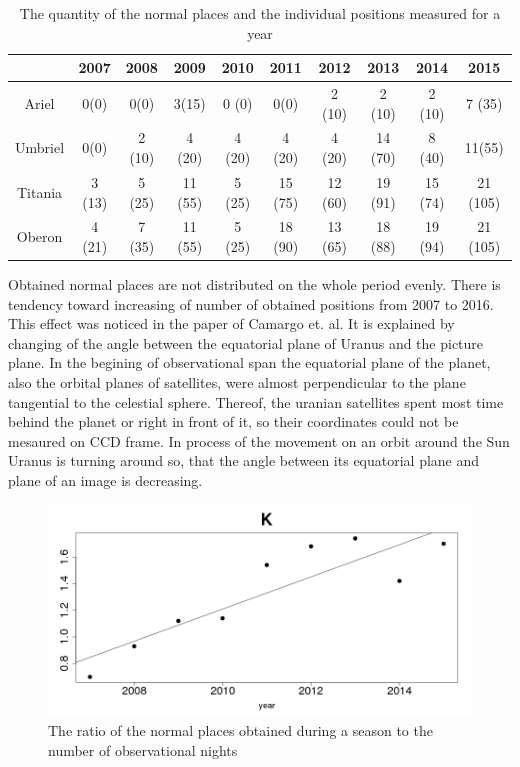 \documentclass[]{article}
\begin{document}
\begin{table}
\caption{The quantity of the normal places and the individual positions measured for a year}
\label{number_of_points}
\begin{center}
\begin{tabular}{|c|c|c|c|c|c|c|c|c|c|}
\hline
 & 2007 & 2008 & 2009 & 2010 & 2011 & 2012 & 2013 & 2014 & 2015\\
\hline
Ariel & 0(0) & 0(0) & 3(15) & 0 (0) & 0(0) & 2 (10) & 2 (10) & 2 (10) & 7 (35)\\
Umbriel & 0(0) & 2 (10) & 4 (20) & 4 (20) & 4 (20) & 4 (20) & 14 (70) & 8 (40) & 11(55)\\
Titania & 3 (13) & 5 (25) & 11 (55) & 5 (25) & 15 (75) & 12 (60) & 19 (91) & 15 (74) & 21 (105)\\
Oberon & 4 (21) & 7 (35) & 11 (55) & 5 (25) & 18 (90) & 13 (65) & 18 (88) & 19 (94) & 21 (105) \\
\hline
\end{tabular}
\end{center}
\end{table}
Obtained normal places are not distributed on the whole period evenly. There is tendency toward increasing of number of obtained positions from 2007 to 2016. This effect was noticed in the paper of Camargo et. al. \cite{2} It is explained by changing of the angle between the equatorial plane of Uranus and the picture plane. In the begining of observational span the equatorial plane of the planet, also the orbital planes of satellites, were almost perpendicular to the plane tangential to the celestial sphere. Thereof, the uranian satellites spent most time behind the planet or right in front of it, so their coordinates could not be mesaured on CCD frame. In process of the movement on an orbit around the Sun Uranus is turning around so, that the angle between its equatorial plane and plane of an image is decreasing.
\begin{figure} 
\vspace{-4ex}
\includegraphics[width=\linewidth]{K}
\caption{The ratio of the normal places obtained during a season to the number of observational nights}
\label{fig:K}
\end{figure}
\end{document}
